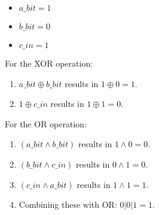 \documentclass{article}
\begin{document}
\begin{itemize}
    \item \(a\_bit = 1\)
    \item \(b\_bit = 0\)
    \item \(c\_in = 1\)
\end{itemize}

For the XOR operation:
\begin{enumerate}
    \item \(a\_bit \oplus b\_bit\) results in \(1 \oplus 0 = 1\).
    \item \(1 \oplus c\_in\) results in \(1 \oplus 1 = 0\).
\end{enumerate}

For the OR operation:
\begin{enumerate}
    \item \((a\_bit \land b\_bit)\) results in \(1 \land 0 = 0\).
    \item \((b\_bit \land c\_in)\) results in \(0 \land 1 = 0\).
    \item \((c\_in \land a\_bit)\) results in \(1 \land 1 = 1\).
    \item Combining these with OR: \(0 | 0 | 1 = 1\).
\end{enumerate}
\end{document}
